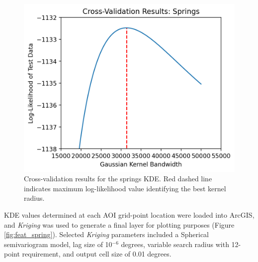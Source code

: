 \begin{figure}[H]
\centering
\includegraphics[scale=.60]{templates/images/Figure-Springs_kde_gridsearchcv_result.png}
\singlespacing
\caption[Spring density parameter tuning]{Cross-validation results for the springs KDE. Red dashed line indicates maximum log-likelihood value identifying the best kernel radius.}
\label{fig:spring_cv}
\end{figure}

KDE values determined at each AOI grid-point location were loaded into ArcGIS, and \textit{Kriging} was used to generate a final layer for plotting purposes (Figure \ref{fig:feat_spring}). Selected \textit{Kriging} parameters included a Spherical semivariogram model, lag size of 10$^{-6}$ degrees, variable search radius with 12-point requirement, and output cell size of 0.01 degrees.

